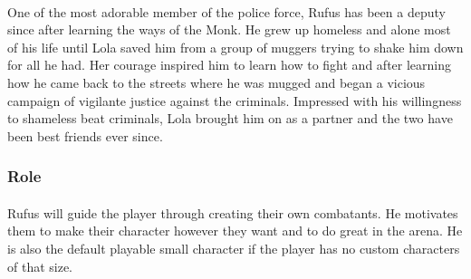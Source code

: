\paragraph{} One of the most adorable member of the police force, Rufus has been a deputy since after learning the ways of the Monk. He grew up homeless and alone most of his life until Lola saved him from a group of muggers trying to shake him down for all he had. Her courage inspired him to learn how to fight and after learning how he came back to the streets where he was mugged and began a vicious campaign of vigilante justice against the criminals. Impressed with his willingness to shameless beat criminals, Lola brought him on as a partner and the two have been best friends ever since.

\subsubsection{Role}

\paragraph{} Rufus will guide the player through creating their own combatants. He motivates them to make their character however they want and to do great in the arena. He is also the default playable small character if the player has no custom characters of that size.